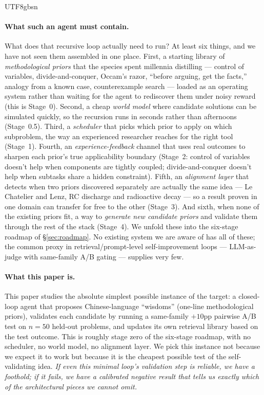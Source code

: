 \documentclass{article}
\begin{document}
\begin{CJK*}{UTF8}{gbsn}
\paragraph{What such an agent must contain.}
What does that recursive loop actually need to run? At least six
things, and we have not seen them assembled in one place. First,
a starting library of \emph{methodological priors} that the
species spent millennia distilling --- control of variables,
divide-and-conquer, Occam's razor, ``before arguing, get the
facts,'' analogy from a known case, counterexample search ---
loaded as an operating system rather than waiting for the agent
to rediscover them under noisy reward (this is Stage~0). Second,
a cheap \emph{world model} where candidate solutions can be
simulated quickly, so the recursion runs in seconds rather than
afternoons (Stage~0.5). Third, a \emph{scheduler} that picks
which prior to apply on which subproblem, the way an experienced
researcher reaches for the right tool (Stage~1). Fourth, an
\emph{experience-feedback} channel that uses real outcomes to
sharpen each prior's true applicability boundary (Stage~2: control
of variables doesn't help when components are tightly coupled;
divide-and-conquer doesn't help when subtasks share a hidden
constraint). Fifth, an \emph{alignment layer} that detects when
two priors discovered separately are actually the same idea ---
Le Chatelier and Lenz, RC discharge and radioactive decay ---
so a result proven in one domain can transfer for free to the
other (Stage~3). And sixth, when none of the existing priors
fit, a way to \emph{generate new candidate priors} and validate
them through the rest of the stack (Stage~4). We unfold these
into the six-stage roadmap of \S\ref{sec:roadmap}. No existing
system we are aware of has all of these; the common proxy in
retrieval/prompt-level self-improvement loops --- LLM-as-judge
with same-family A/B gating --- supplies very few.

\paragraph{What this paper is.}
This paper studies the absolute simplest possible instance of the
target: a closed-loop agent that proposes Chinese-language
``wisdoms'' (one-line methodological priors), validates each
candidate by running a same-family \(+10\)pp pairwise A/B test
on \(n=50\) held-out problems, and updates its own retrieval
library based on the test outcome. This is roughly stage zero of
the six-stage roadmap, with no scheduler, no world model, no
alignment layer. We pick this instance not because we expect it
to work but because it is the cheapest possible test of the
self-validating idea. \emph{If even this minimal loop's
validation step is reliable, we have a foothold; if it fails,
we have a calibrated negative result that tells us exactly which
of the architectural pieces we cannot omit.}


\end{CJK*}
\end{document}

